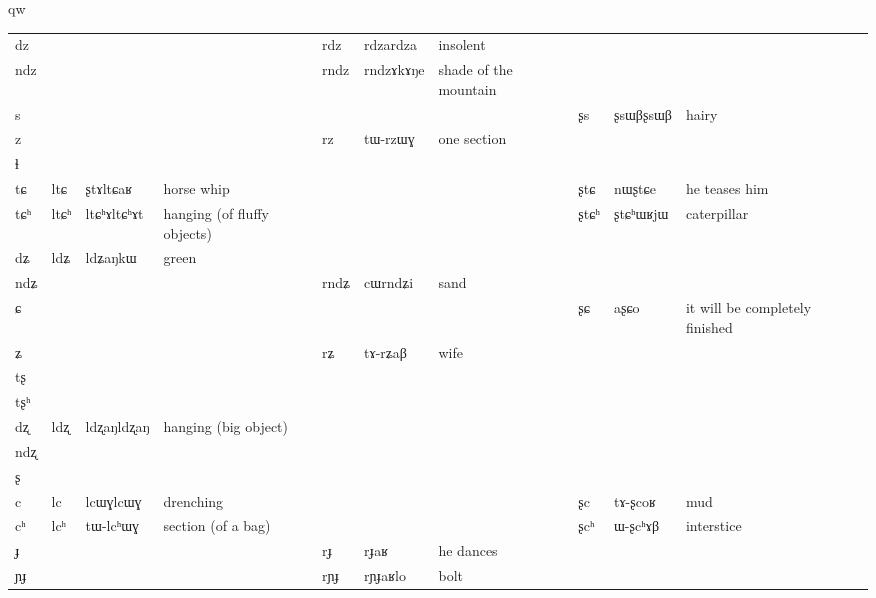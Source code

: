 qw\documentclass[oldfontcommands,oneside,a4paper,11pt]{article}
\newcommand{\ipa}[1]{{\phon #1}} %
\newcommand{\tib}[1]{\cellcolor{lightgray}\textbf{#1}}
\newcommand{\idph}[1]{\cellcolor{gray}\textbf{#1}}
\begin{document}
\begin{table}
{\begin{tabular}{l|lll|lll|lll|l}
\ipa{dz}  & 	  & 	  & 	  & 	 \ipa{rdz} \idph{}  & 	 \ipa{rdzardza}  & 	 insolent & 	 & 	 & 	 & 	\\
\ipa{ndz}  & 	  & 	  & 	  & 	 \ipa{rndz}  & 	 \ipa{rndzɤkɤŋe}  & 	 shade of the mountain & 	 & 	 & 	 & 	\\
\ipa{s}  & 	  & 	  & 	  & 	 & 	 & 	 & 	 \ipa{ʂs} \idph{}  & 	 \ipa{ʂsɯβʂsɯβ}  & 	 hairy & 	\\
\ipa{z}  & 	  & 	  & 	  & 	 \ipa{rz}  & 	 \ipa{tɯ-rzɯɣ}  & 	 one section & 	 & 	 & 	 & 	\\
\ipa{ɬ}  & 	  & 	  & 	  & 	  & 	  & 	  & 	 & 	 & 	 & 	\\
\ipa{tɕ}  & 	 \ipa{ltɕ}  & 	 \ipa{ʂtɤltɕaʁ}  & 	 horse whip  & 	 & 	 & 	 & 	 \ipa{ʂtɕ}  & 	 \ipa{nɯʂtɕe}  & 	he teases him  & 	\\
\ipa{tɕʰ}  & 	 \ipa{ltɕʰ} \idph{}  & 	 \ipa{ltɕʰɤltɕʰɤt}  & 	hanging (of fluffy objects)  & 	 & 	 & 	 & 	 \ipa{ʂtɕʰ}  & 	 \ipa{ʂtɕʰɯʁjɯ}  & 	caterpillar  & 	\\
\ipa{dʑ}  & 	 \ipa{ldʑ} \tib{}  & 	 \ipa{ldʑaŋkɯ}  & 	 green & 	  & 	  & 	  & 	 & 	 & 	 & 	\\
\ipa{ndʑ}  & 	  & 	  & 	  & 	 \ipa{rndʑ}  & 	 \ipa{cɯrndʑi}  & 	sand  & 	 & 	 & 	 & 	\\
\ipa{ɕ}  & 	  & 	  & 	  & 	 & 	 & 	 & 	 \ipa{ʂɕ}  & 	 \ipa{aʂɕo}  & 	 it will be completely finished  & 	\\
\ipa{ʑ}  & 	  & 	  & 	  & 	 \ipa{rʑ}  & 	 \ipa{tɤ-rʑaβ}  & 	wife  & 	 & 	 & 	 & 	\\
\ipa{tʂ}  & 	  & 	  & 	  & 	  & 	  & 	  & 	 & 	 & 	 & 	\\
\ipa{tʂʰ}  & 	  & 	  & 	  & 	  & 	  & 	  & 	 & 	 & 	 & 	\\
\ipa{dʐ}  & 	 \ipa{ldʐ} \idph{}  & 	 \ipa{ldʐaŋldʐaŋ}  & 	 hanging (big object) & 	  & 	  & 	  & 	 & 	 & 	 & 	\\
\ipa{ndʐ}  & 	  & 	  & 	  & 	  & 	  & 	  & 	 & 	 & 	 & 	\\
\ipa{ʂ}  & 	  & 	  & 	  & 	  & 	  & 	  & 	 & 	 & 	 & 	\\
\ipa{c}  & 	 \ipa{lc} \idph{} & 	 \ipa{lcɯɣlcɯɣ}  & 	 drenching & 	 & 	 & 	 & 	 \ipa{ʂc}  & 	 \ipa{tɤ-ʂcoʁ}  & 	 mud & 	\\
\ipa{cʰ}  & 	 \ipa{lcʰ}  & 	 \ipa{tɯ-lcʰɯɣ}  & 	 section (of a bag) & 	 & 	 & 	 & 	 \ipa{ʂcʰ}  & 	 \ipa{ɯ-ʂcʰɤβ}  & 	 interstice & 	\\
\ipa{ɟ}  & 	  & 	  & 	  & 	 \ipa{rɟ}  & 	 \ipa{rɟaʁ}  & 	he dances  & 	 & 	 & 	 & 	\\
\ipa{ɲɟ}  & 	  & 	  & 	  & 	 \ipa{rɲɟ}  & 	 \ipa{rɲɟaʁlo}  & 	 bolt & 	 & 	 & 	 & 	\\

\end{tabular}}
\end{table}
\end{document}
